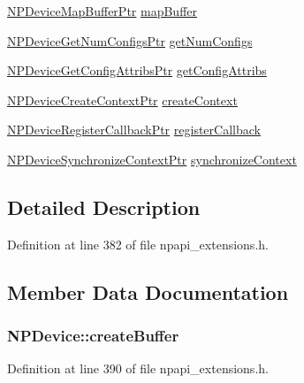 \begin{DoxyCompactItemize}
\item 
\hyperlink{npapi__extensions_8h_ad14ca40b2289d2bd9e7c55cb02448b5e}{NPDeviceMapBufferPtr} \hyperlink{struct_n_p_device_a90bcf80db7548761df5e9688747c1e5f}{mapBuffer}
\item 
\hyperlink{npapi__extensions_8h_ade5ff8d3cb504dfbf245dcaebc7cd3b2}{NPDeviceGetNumConfigsPtr} \hyperlink{struct_n_p_device_a86902b4ee5515b618b22e600741556d0}{getNumConfigs}
\item 
\hyperlink{npapi__extensions_8h_a660df27bed370abf3baebb56c704200a}{NPDeviceGetConfigAttribsPtr} \hyperlink{struct_n_p_device_a7f8d7a0ae8a78afb5de685b0af8d3f96}{getConfigAttribs}
\item 
\hyperlink{npapi__extensions_8h_a36b356d09b5e82da40ec7ad19bd42bc6}{NPDeviceCreateContextPtr} \hyperlink{struct_n_p_device_a8b4e07ce1c1ae97fdc633ffd73fee9a3}{createContext}
\item 
\hyperlink{npapi__extensions_8h_a003fb978f531f551765fb44894197b51}{NPDeviceRegisterCallbackPtr} \hyperlink{struct_n_p_device_aa90f4b508a73bcea3589b47df92f5b47}{registerCallback}
\item 
\hyperlink{npapi__extensions_8h_afd16b06e76a421e061954c742082cd1c}{NPDeviceSynchronizeContextPtr} \hyperlink{struct_n_p_device_a2ac8d1580ecf9da82b0f7e3ad5b1374e}{synchronizeContext}
\end{DoxyCompactItemize}


\subsection{Detailed Description}


Definition at line 382 of file npapi\_\-extensions.h.



\subsection{Member Data Documentation}
\hypertarget{struct_n_p_device_a115b39b51998f67d7a44cb9e2ae654ff}{
\subsubsection[{createBuffer}]{ {\bf NPDevice::createBuffer}}}
\label{struct_n_p_device_a115b39b51998f67d7a44cb9e2ae654ff}


Definition at line 390 of file npapi\_\-extensions.h.

